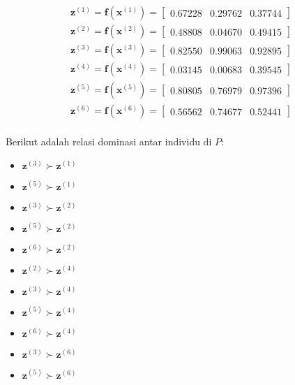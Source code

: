$$
\begin{align}
  \mathbf{z}^{(1)}=\mathbf{f}(\mathbf{x}^{(1)})=\begin{bmatrix}0.67228 & 0.29762 & 0.37744\end{bmatrix}\\
  \mathbf{z}^{(2)}=\mathbf{f}(\mathbf{x}^{(2)})=\begin{bmatrix}0.48808 & 0.04670 & 0.49415\end{bmatrix}\\
  \mathbf{z}^{(3)}=\mathbf{f}(\mathbf{x}^{(3)})=\begin{bmatrix}0.82550 & 0.99063 & 0.92895\end{bmatrix}\\
  \mathbf{z}^{(4)}=\mathbf{f}(\mathbf{x}^{(4)})=\begin{bmatrix}0.03145 & 0.00683 & 0.39545\end{bmatrix}\\
  \mathbf{z}^{(5)}=\mathbf{f}(\mathbf{x}^{(5)})=\begin{bmatrix}0.80805 & 0.76979 & 0.97396\end{bmatrix}\\
  \mathbf{z}^{(6)}=\mathbf{f}(\mathbf{x}^{(6)})=\begin{bmatrix}0.56562 & 0.74677 & 0.52441\end{bmatrix}\\
\end{align}
$$

Berikut adalah relasi dominasi antar individu di $P$:

\begin{itemize}
  \item $ \mathbf{z}^{(3)} \succ \mathbf{z}^{(1)} $
  \item $ \mathbf{z}^{(5)} \succ \mathbf{z}^{(1)} $
  \item $ \mathbf{z}^{(3)} \succ \mathbf{z}^{(2)} $
  \item $ \mathbf{z}^{(5)} \succ \mathbf{z}^{(2)} $
  \item $ \mathbf{z}^{(6)} \succ \mathbf{z}^{(2)} $
  \item $ \mathbf{z}^{(2)} \succ \mathbf{z}^{(4)} $
  \item $ \mathbf{z}^{(3)} \succ \mathbf{z}^{(4)} $
  \item $ \mathbf{z}^{(5)} \succ \mathbf{z}^{(4)} $
  \item $ \mathbf{z}^{(6)} \succ \mathbf{z}^{(4)} $
  \item $ \mathbf{z}^{(3)} \succ \mathbf{z}^{(6)} $
  \item $ \mathbf{z}^{(5)} \succ \mathbf{z}^{(6)} $
\end{itemize}

